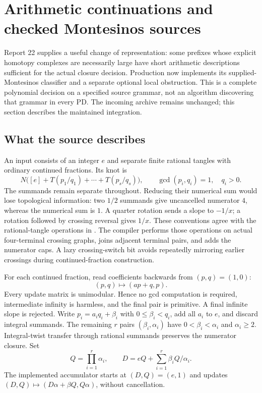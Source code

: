 \section{Arithmetic continuations and checked Montesinos sources}
\label{sec:rational-arithmetic}

Report 22 supplies a useful change of representation: some prefixes whose
explicit homotopy complexes are necessarily large have short arithmetic
descriptions sufficient for the actual closure decision.  Production now
implements its supplied-Montesinos classifier and a separate optional local
obstruction.  This is a complete polynomial decision on a specified source
grammar, not an algorithm discovering that grammar in every PD.  The incoming
archive remains unchanged; this section describes the maintained integration.

\subsection{What the source describes}
An input consists of an integer $e$ and separate finite rational tangles
with ordinary continued fractions.  Its knot is
\[
 N\bigl([e]+T(p_1/q_1)+\cdots+T(p_s/q_s)\bigr),
 \qquad \gcd(p_i,q_i)=1,\quad q_i>0.
\]
The summands remain separate throughout.  Reducing their numerical sum
would lose topological information: two $1/2$ summands give uncancelled
numerator $4$, whereas the numerical sum is $1$.  A quarter rotation
sends a slope to $-1/x$; a rotation followed by crossing reversal gives
$1/x$.  These conventions agree with the rational-tangle operations in
\cite{rational-tangles}.  The compiler performs those operations on actual
four-terminal crossing graphs, joins adjacent terminal pairs, and adds the
numerator caps.  A lazy crossing-switch bit avoids repeatedly mirroring
earlier crossings during continued-fraction construction.

For each continued fraction, read coefficients backwards from $(p,q)=(1,0)$:
\[
 (p,q)\longmapsto(ap+q,p).
\]
Every update matrix is unimodular.  Hence no gcd computation is required,
intermediate infinity is harmless, and the final pair is primitive.
A final infinite slope is rejected.  Write $p_i=a_iq_i+\beta_i$ with
$0\le\beta_i<q_i$, add all $a_i$ to $e$, and discard integral summands.
The remaining $r$ pairs $(\beta_i,\alpha_i)$ have
$0<\beta_i<\alpha_i$ and $\alpha_i\ge2$.  Integral-twist transfer through
rational summands preserves the numerator closure.  Set
\begin{equation}
 Q=\prod_{i=1}^{r}\alpha_i,\qquad
 D=eQ+\sum_{i=1}^{r}\beta_i Q/\alpha_i.
 \label{eq:rational-determinant}
\end{equation}
The implemented accumulator starts at $(D,Q)=(e,1)$ and updates
$(D,Q)\mapsto(D\alpha+\beta Q,Q\alpha)$, without cancellation.

